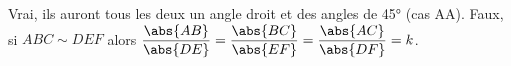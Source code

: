 %
%
    \begin{tasks}
        \task Vrai, ils auront tous les deux un angle droit et des angles de \ang{45} (cas AA).
        \task Faux, si \(ABC \sim DEF\) alors \(\dfrac{\abs{AB}}{\abs{DE}} = \dfrac{\abs{BC}}{\abs{EF}} = \dfrac{\abs{AC}}{\abs{DF}} = k\).
    \end{tasks}

